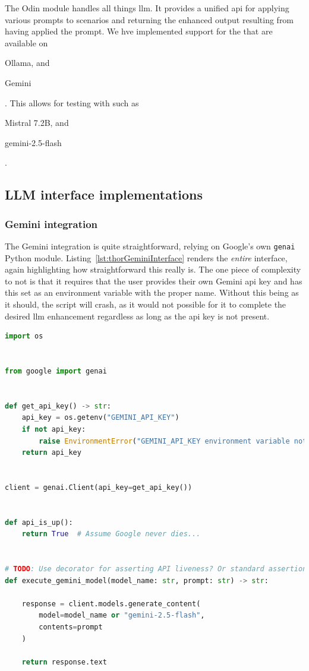The Odin module handles all things \acrshort{llm}. It provides a unified
\acrshort{api} for applying various prompts to scenarios and returning the
enhanced output resulting from having applied the prompt. We hve implemented
support for the  that are available on \begin{inparaenum}
    \item Ollama, and
    \item Gemini
\end{inparaenum}. This allows for testing with  such as
\begin{inparaenum}\setcounter{enumi}{2}
    \item Mistral \num{7.2}B, and
    \item gemini-2.5-flash
\end{inparaenum}.

\subsection*{LLM interface implementations}
\subsubsection{Gemini integration}

The Gemini integration is quite straightforward, relying on Google's own
\texttt{genai} Python module. Listing~\ref{lst:thorGeminiInterface} renders the
\emph{entire} interface, again highlighting how straightforward this really is.
The one piece of complexity to not is that it requires that the user provides
their own Gemini \acrshort{api} key and has this set as an environment variable
with the proper name. Without this being as it should, the script will crash, as
it would not possible for it to complete the desired \acrshort{llm} enhancement
regardless as long as the \acrshort{api} key is not present.

\begin{lstlisting}[caption={llm\_api\_interfaces/gemini\_interface.py, The implementation of a Gemini interface for executing prompts.}, label={lst:thorGeminiInterface}, language={Python}]
import os


from google import genai


def get_api_key() -> str:
    api_key = os.getenv("GEMINI_API_KEY")
    if not api_key:
        raise EnvironmentError("GEMINI_API_KEY environment variable not set.")
    return api_key


client = genai.Client(api_key=get_api_key())


def api_is_up():
    return True  # Assume Google never dies...


# TODO: Use decorator for asserting API liveness? Or standard assertion??
def execute_gemini_model(model_name: str, prompt: str) -> str:

    response = client.models.generate_content(
        model=model_name or "gemini-2.5-flash",
        contents=prompt
    )

    return response.text
\end{lstlisting}

